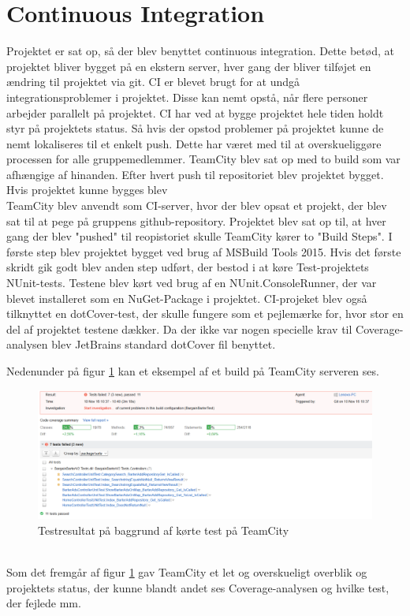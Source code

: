 \section{Continuous Integration}
Projektet er sat op, så der blev benyttet continuous integration. Dette betød, at projektet bliver bygget på en ekstern server, hver gang der bliver tilføjet en ændring til projektet via git. CI er blevet brugt for at undgå integrationsproblemer i projektet. Disse kan nemt opstå, når flere personer arbejder parallelt på projektet. CI har ved at bygge projektet hele tiden holdt styr på projektets status. Så hvis der opstod problemer på projektet kunne de nemt lokaliseres til et enkelt push. Dette har været med til at overskueliggøre processen for alle gruppemedlemmer.
TeamCity blev sat op med to build som var afhængige af hinanden. Efter hvert push til repositoriet blev projektet bygget. Hvis projektet kunne bygges blev 
\\
\noindent TeamCity blev anvendt som CI-server, hvor der blev opsat et  projekt, der blev sat til at pege på gruppens github-repository. Projektet blev sat op til, at hver gang der blev "pushed" til reopistoriet skulle TeamCity kører to "Build Steps". I første step blev projektet bygget ved brug af MSBuild Tools 2015. Hvis det første skridt gik godt blev anden step udført, der bestod i at køre Test-projektets NUnit-tests. Testene blev kørt ved brug af en NUnit.ConsoleRunner, der var blevet installeret som en NuGet-Package i projektet.  
CI-projeket blev også tilknyttet en dotCover-test, der skulle fungere som et pejlemærke for, hvor stor en del af projektet testene dækker. Da der ikke var nogen specielle krav til Coverage-analysen blev JetBrains standard dotCover fil benyttet.

\noindent Nedenunder på figur \ref{fig:TeamCityTest} kan et eksempel af et build på TeamCity serveren ses. 
\begin{figure}[ht!]
	\centering
	\includegraphics[width=120mm]{figures/TeamCityTest.png}
	\caption{Testresultat på baggrund af kørte test på TeamCity}
	\label{fig:TeamCityTest}
\end{figure}
\\
Som det fremgår af figur \ref{fig:TeamCityTest} gav TeamCity et let og overskueligt overblik og projektets status, der kunne blandt andet ses Coverage-analysen og hvilke test, der fejlede mm.
